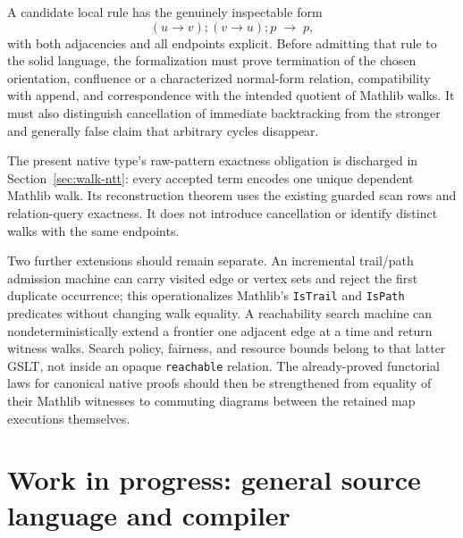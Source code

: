 \documentclass[11pt]{article}
\theoremstyle{remark}
\newcommand{\code}[1]{\texttt{#1}}
\begin{document}
A candidate local rule has the genuinely inspectable form
\[
  (u\!\to\!v);(v\!\to\!u);p \;\longrightarrow\; p,
\]
with both adjacencies and all endpoints explicit.  Before admitting that rule
to the solid language, the formalization must prove termination of the chosen
orientation, confluence or a characterized normal-form relation, compatibility
with append, and correspondence with the intended quotient of Mathlib walks.
It must also distinguish cancellation of immediate backtracking from the
stronger and generally false claim that arbitrary cycles disappear.

The present native type's raw-pattern exactness obligation is discharged in
Section~\ref{sec:walk-ntt}: every accepted term encodes one unique dependent
Mathlib walk.  Its reconstruction theorem uses the existing guarded scan
rows and relation-query exactness.  It does not introduce cancellation or
identify distinct walks with the same endpoints.

Two further extensions should remain separate.  An incremental trail/path
admission machine can carry visited edge or vertex sets and reject the first
duplicate occurrence; this operationalizes Mathlib's \code{IsTrail} and
\code{IsPath} predicates without changing walk equality.  A reachability
search machine can nondeterministically extend a frontier one adjacent edge at
a time and return witness walks.  Search policy, fairness, and resource bounds
belong to that latter GSLT, not inside an opaque \code{reachable} relation.
The already-proved functorial laws for canonical native proofs should then be
strengthened from equality of their Mathlib witnesses to commuting diagrams
between the retained map executions themselves.

\section{Work in progress: general source language and compiler}
\label{app:frontend}
\end{document}
